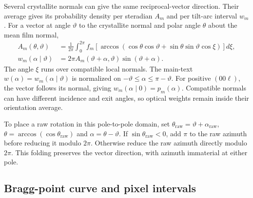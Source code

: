 Several crystallite normals can give the same reciprocal-vector direction. Their average gives its probability density per steradian $A_m$ and per tilt-arc interval $w_m$. For a vector at angle $\vartheta$ to the crystallite normal and polar angle $\theta$ about the mean film normal,
\begin{equation}
 \begin{aligned}
 A_m(\theta,\vartheta)&=\frac{1}{2\pi}\int_0^{2\pi}
 f_m\!\left[\arccos(\cos\theta\cos\vartheta+\sin\theta\sin\vartheta\cos\xi)\right]d\xi,\\
 w_m(\alpha\mid\vartheta)&=2\pi A_m(\vartheta+\alpha,\vartheta)\sin(\vartheta+\alpha).
 \end{aligned}
 \label{eq:si_mosaic_cone_average}
\end{equation}
The angle $\xi$ runs over compatible local normals. The main-text $w(\alpha)=w_m(\alpha\mid\vartheta)$ is normalized on $-\vartheta\leq\alpha\leq\pi-\vartheta$. For positive $(00\ell)$, the vector follows its normal, giving $w_m(\alpha\mid0)=p_m(\alpha)$. Compatible normals can have different incidence and exit angles, so optical weights remain inside their orientation average.

To place a raw rotation in this pole-to-pole domain, set $\theta_{\mathrm{raw}}=\vartheta+\alpha_{\mathrm{raw}}$, $\theta=\arccos(\cos\theta_{\mathrm{raw}})$ and $\alpha=\theta-\vartheta$. If $\sin\theta_{\mathrm{raw}}<0$, add $\pi$ to the raw azimuth before reducing it modulo $2\pi$. Otherwise reduce the raw azimuth directly modulo $2\pi$. This folding preserves the vector direction, with azimuth immaterial at either pole.

\subsection{Bragg-point curve and pixel intervals}
\label{subsec:si_bragg_curve_pixels}

